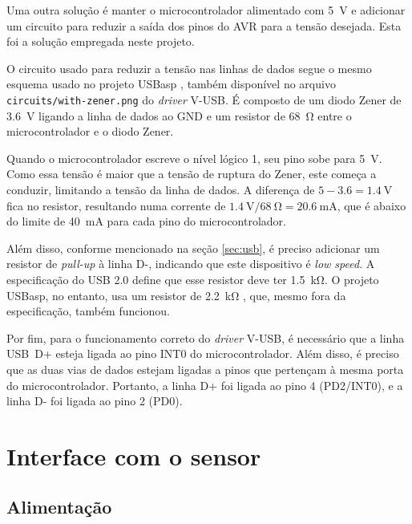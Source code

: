 \documentclass[brazil,pagestart=firstchapter]{abnt}
\newcommand*{\GND}{GND\xspace}
\newcommand*{\VUSB}{\mbox{V-USB}\xspace}
\begin{document}
Uma outra solução é manter o microcontrolador alimentado com \SI{5}{\volt} e
adicionar um circuito para reduzir a saída dos pinos do AVR para a tensão
desejada. Esta foi a solução empregada neste projeto.

O circuito usado para reduzir a tensão nas linhas de dados segue o mesmo
esquema usado no projeto USBasp \cite{USBasp}, também disponível no arquivo
\texttt{circuits/with-zener.png} do \textit{driver} \VUSB \cite{VUSBdriver}.
É composto de um diodo Zener de \SI{3.6}{\volt} ligando a linha de dados ao
\GND e um resistor de \SI{68}{\ohm} entre o microcontrolador e o diodo
Zener.

Quando o microcontrolador escreve o nível lógico 1, seu pino sobe para
\SI{5}{\volt}. Como essa tensão é maior que a tensão de ruptura do Zener,
este começa a conduzir, limitando a tensão da linha de dados. A diferença de
$\num{5} - \num{3.6} = \SI{1.4}{\volt}$ fica no resistor, resultando numa
corrente de $\SI{1.4}{\volt} / \SI{68}{\ohm} = \SI{20.6}{\milli\ampere}$,
que é abaixo do limite de \SI{40}{\milli\ampere} para cada pino do
microcontrolador. \cite[p.~235]{ATmega8}

Além disso, conforme mencionado na seção \ref{sec:usb}, é preciso adicionar
um resistor de \textit{pull-up} à linha D-, indicando que este dispositivo
é \textit{low speed}. A especificação do USB 2.0 define que esse resistor
deve ter \SI{1.5}{\kilo\ohm}. \cite[p.~141,~180]{usb20} O projeto USBasp, no
entanto, usa um resistor de \SI{2.2}{\kilo\ohm} \cite{USBasp}, que, mesmo
fora da especificação, também funcionou.

Por fim, para o funcionamento correto do \textit{driver} \VUSB, é necessário
que a linha USB~D+ esteja ligada ao pino INT0 do microcontrolador. Além
disso, é preciso que as duas vias de dados estejam ligadas a pinos que
pertençam à mesma porta do microcontrolador.
\cite[usbconfig-prototype.h]{VUSBdriver} Portanto, a linha D+ foi ligada ao
pino 4 (PD2/INT0), e a linha D- foi ligada ao pino 2 (PD0).


\section{Interface com o sensor}
\label{sec:hardware_sensor}

\subsection{Alimentação}
\label{sub:hardware_sensor_alimentacao}
\end{document}
